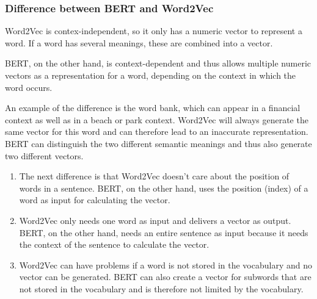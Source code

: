 \subsubsection{Difference between BERT and Word2Vec}
Word2Vec is contex-independent, so it only has a numeric vector to represent a word. If a word has several meanings, these are combined into a vector.

BERT, on the other hand, is context-dependent and thus allows multiple numeric vectors as a representation for a word, depending on the context in which the word occurs.

An example of the difference is the word bank, which can appear in a financial context as well as in a beach or park context. Word2Vec will always generate the same vector for this word and can therefore lead to an inaccurate representation. BERT can distinguish the two different semantic meanings and thus also generate two different vectors.

\begin{enumerate}
	\item The next difference is that Word2Vec doesn't care about the position of words in a sentence. BERT, on the other hand, uses the position (index) of a word as input for calculating the vector.
	\item Word2Vec only needs one word as input and delivers a vector as output. BERT, on the other hand, needs an entire sentence as input because it needs the context of the sentence to calculate the vector.
	\item Word2Vec can have problems if a word is not stored in the vocabulary and no vector can be generated. BERT can also create a vector for subwords that are not stored in the vocabulary and is therefore not limited by the vocabulary.
\end{enumerate}

